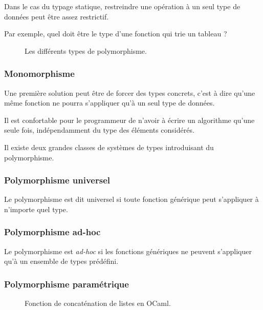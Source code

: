 Dans le cas du typage statique, restreindre une opération à un seul type de
données peut être assez restrictif.

Par exemple, quel doit être le type d'une fonction qui trie un tableau ?

\begin{figure}
\centering

\caption{Les différents types de polymorphisme.}
\label{fig:types-de-polymorphisme}
\end{figure}

\subsubsection{Monomorphisme}

Une première solution peut être de forcer des types concrets, c'est à dire
qu'une même fonction ne pourra s'appliquer qu'à un seul type de données.

Il est confortable pour le programmeur de n'avoir à écrire un algorithme qu'une
seule fois, indépendamment du type des éléments considérés.

Il existe deux grandes classes de systèmes de types introduisant du
polymorphisme.

\subsubsection{Polymorphisme universel}


Le polymorphisme est dit universel si toute fonction générique peut s'appliquer
à n'importe quel type.

\subsubsection{Polymorphisme ad-hoc}


Le polymorphisme est \emph{ad-hoc} si les fonctions génériques ne peuvent
s'appliquer qu'à un ensemble de types prédéfini.

\subsubsection{Polymorphisme paramétrique}

\cite{Milner78}

\begin{figure}
  \caption{Fonction de concaténation de listes en OCaml.}
  \label{fig:listappend}
\end{figure}

